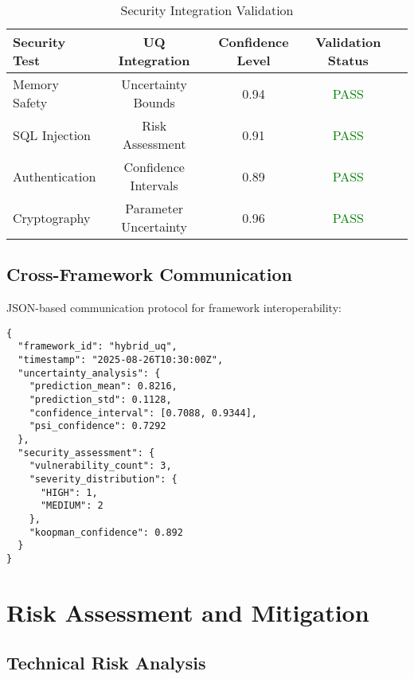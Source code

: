 \documentclass[11pt,a4paper]{article}
\begin{document}
\begin{table}[H]
\centering
\caption{Security Integration Validation}
\label{tab:security_integration}
\begin{tabular}{@{}lcccc@{}}
\toprule
Security Test & UQ Integration & Confidence Level & Validation Status \\
\midrule
Memory Safety & Uncertainty Bounds & 0.94 & \textcolor{green}{PASS} \\
SQL Injection & Risk Assessment & 0.91 & \textcolor{green}{PASS} \\
Authentication & Confidence Intervals & 0.89 & \textcolor{green}{PASS} \\
Cryptography & Parameter Uncertainty & 0.96 & \textcolor{green}{PASS} \\
\bottomrule
\end{tabular}
\end{table}

\subsection{Cross-Framework Communication}
\label{subsec:cross_framework}

JSON-based communication protocol for framework interoperability:

\begin{lstlisting}[caption=Cross-Framework Communication Protocol,captionpos=b]
{
  "framework_id": "hybrid_uq",
  "timestamp": "2025-08-26T10:30:00Z",
  "uncertainty_analysis": {
    "prediction_mean": 0.8216,
    "prediction_std": 0.1128,
    "confidence_interval": [0.7088, 0.9344],
    "psi_confidence": 0.7292
  },
  "security_assessment": {
    "vulnerability_count": 3,
    "severity_distribution": {
      "HIGH": 1,
      "MEDIUM": 2
    },
    "koopman_confidence": 0.892
  }
}
\end{lstlisting}

\section{Risk Assessment and Mitigation}
\label{sec:risk_assessment}

\subsection{Technical Risk Analysis}
\label{subsec:technical_risks}
\end{document}
